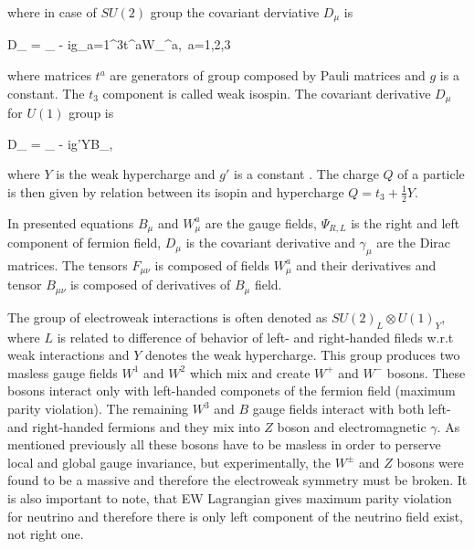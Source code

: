 where in case of $SU(2)$ group the covariant derviative $D_{\mu}$ is

{
   D_{\mu} = \partial_{\mu} - ig\sum_{a=1}^{3}t^{a}W_{\mu}^{a},~a=1,2,3
}

where matrices $t^{a}$ are generators of group composed by Pauli matrices and $g$ is a constant. The $t_{3}$ component is called weak isospin. The covariant derivative $D_{\mu}$ for $U(1)$ group is

{
   D_{\mu} = \partial_{\mu} - ig'YB_{\mu},
}

where $Y$ is the weak hypercharge and $g'$ is a constant . The charge $Q$ of a particle is then given by relation between its isopin and hypercharge $Q= t_{3} + \frac{1}{2}Y$.

In presented equations $B_{\mu}$ and $W_{\mu}^{a}$ are the gauge fields, $\Psi_{R,L}$ is the right and left component of fermion field, $D_{\mu}$ is the covariant derivative and $\gamma_{\mu}$ are the Dirac matrices. The tensors $F_{\mu\nu}$ is composed of fields $W^{a}_{\mu}$ and their derivatives and tensor $B_{\mu\nu}$ is composed  of derivatives of $B_{\mu}$ field.

The group of electroweak interactions is often denoted as $SU(2)_{L} \otimes U(1)_{Y}$, where $L$ is related to difference of behavior of left- and right-handed fileds w.r.t weak interactions and $Y$ denotes the weak hypercharge. This group produces two masless gauge fields $W^{1}$ and $W^2$ which mix and create $W^{+}$ and $W^{-}$ bosons. These bosons interact only with left-handed componets of the fermion field (maximum parity violation). The remaining $W^{3}$ and $B$ gauge fields interact with both left- and right-handed fermions and they mix into $Z$ boson and electromagnetic $\gamma$. As mentioned previously all these bosons have to be masless in order to perserve local and global gauge invariance, but experimentally, the $W^{\pm}$ and $Z$ bosons were found to be a massive and therefore the electroweak symmetry must be broken. It is also important to note, that EW Lagrangian gives maximum parity violation for neutrino and therefore there is only left component of the neutrino field exist, not right one.


